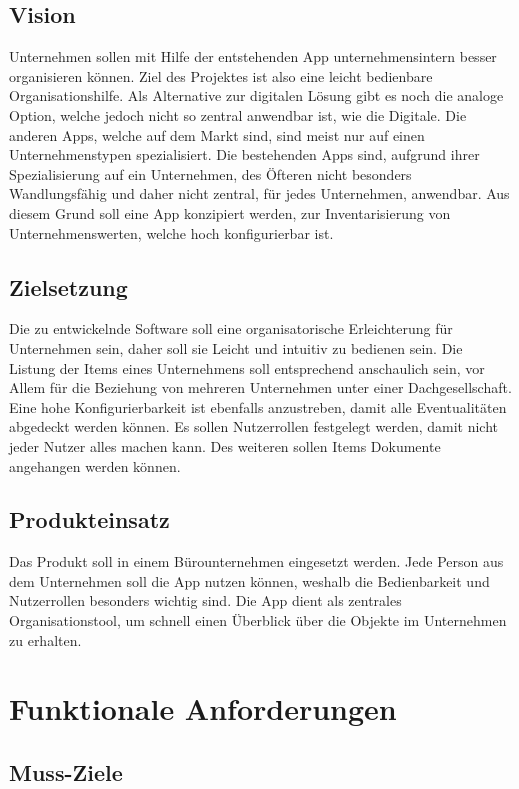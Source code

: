 \documentclass[11pt,a4paper]{report}
\begin{document}
\subsection{Vision}
Unternehmen sollen mit Hilfe der entstehenden App unternehmensintern besser organisieren können.
Ziel des Projektes ist also eine leicht bedienbare Organisationshilfe.
Als Alternative zur digitalen Lösung gibt es noch die analoge Option, welche jedoch nicht so zentral anwendbar ist, wie die Digitale.
Die anderen Apps, welche auf dem Markt sind, sind meist nur auf einen Unternehmenstypen spezialisiert.
Die bestehenden Apps sind, aufgrund ihrer Spezialisierung auf ein Unternehmen, des Öfteren nicht besonders Wandlungsfähig und daher nicht zentral, für jedes Unternehmen, anwendbar.
Aus diesem Grund soll eine App konzipiert werden, zur Inventarisierung von Unternehmenswerten, welche hoch konfigurierbar ist.
\subsection{Zielsetzung}
Die zu entwickelnde Software soll eine organisatorische Erleichterung für Unternehmen sein, daher soll sie Leicht und intuitiv zu bedienen sein. 
Die Listung der Items eines Unternehmens soll entsprechend anschaulich sein, vor Allem für die Beziehung von mehreren Unternehmen unter einer Dachgesellschaft. 
Eine hohe Konfigurierbarkeit ist ebenfalls anzustreben, damit alle Eventualitäten abgedeckt werden können. 
Es sollen Nutzerrollen festgelegt werden, damit nicht jeder Nutzer alles machen kann. 
Des weiteren sollen Items Dokumente angehangen werden können.
\subsection{Produkteinsatz}
Das Produkt soll in einem Bürounternehmen eingesetzt werden. 
Jede Person aus dem Unternehmen soll die App nutzen können, weshalb die Bedienbarkeit und Nutzerrollen besonders wichtig sind. 
Die App dient als zentrales Organisationstool, um schnell einen Überblick über die Objekte im Unternehmen zu erhalten.
\newpage

\section{Funktionale Anforderungen}

\subsection{Muss-Ziele}
\end{document}
